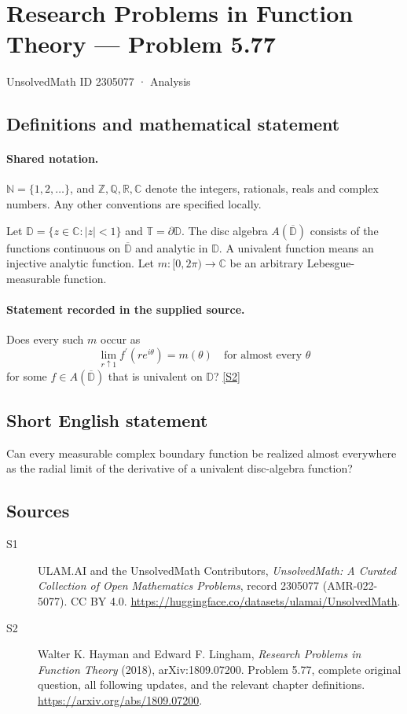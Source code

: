 \documentclass[11pt]{book}
\newcommand{\sref}[2]{\hyperlink{source:#1:#2}{[S#2]}}
\begin{document}
\setcounter{section}{2305076}
\section{Research Problems in Function Theory — Problem 5.77}\label{2305077}
{\small\sffamily UnsolvedMath ID 2305077 · Analysis}
\subsection{Definitions and mathematical statement}

\paragraph{Shared notation.}$\mathbb N=\{1,2,\ldots\}$, and $\mathbb Z,\mathbb Q,\mathbb R,\mathbb C$ denote the integers, rationals, reals and complex numbers. Any other conventions are specified locally.


Let $\mathbb D=\{z\in\mathbb C:|z|<1\}$ and $\mathbb T=\partial\mathbb D$. The disc algebra $A(\overline{\mathbb D})$ consists of the functions continuous on $\overline{\mathbb D}$ and analytic in $\mathbb D$. A univalent function means an injective analytic function. Let $m:[0,2\pi)\to\mathbb C$ be an arbitrary Lebesgue-measurable function.
\paragraph{Statement recorded in the supplied source.}
Does every such $m$ occur as \[\lim_{r\uparrow1}f^{\prime}(re^{i\theta})=m(\theta)\quad\text{for almost every }\theta\] for some $f\in A(\overline{\mathbb D})$ that is univalent on $\mathbb D$? \sref{2305077}{2}
\subsection{Short English statement}
Can every measurable complex boundary function be realized almost everywhere as the radial limit of the derivative of a univalent disc-algebra function?
\subsection{Sources}
\begin{description}
\item[\hypertarget{source:2305077:1}{S1}] ULAM.AI and the UnsolvedMath Contributors, \emph{UnsolvedMath: A Curated Collection of Open Mathematics Problems}, record 2305077 (AMR-022-5077). CC BY 4.0. \url{https://huggingface.co/datasets/ulamai/UnsolvedMath}.
\item[\hypertarget{source:2305077:2}{S2}] Walter K. Hayman and Edward F. Lingham, \emph{Research Problems in Function Theory} (2018), arXiv:1809.07200. Problem 5.77, complete original question, all following updates, and the relevant chapter definitions. \url{https://arxiv.org/abs/1809.07200}.
\end{description}
\label{end:2305077}
\end{document}
